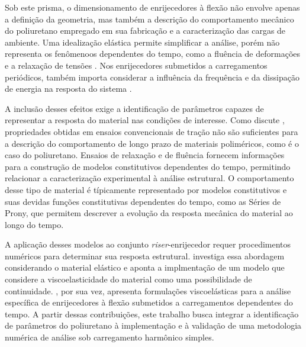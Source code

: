 \documentclass[arial,centeredequations,english,brazilian,oneside,section=TITLE]{ifes8}
\begin{document}

Sob este prisma, o dimensionamento de enrijecedores à flexão não envolve apenas a definição da geometria, mas também a descrição
do comportamento mecânico do poliuretano empregado em sua fabricação e a caracterização das cargas de ambiente. Uma 
idealização elástica permite simplificar a análise, porém não representa os fenômenoos dependentes do tempo, como a fluência 
de deformações e a relaxação de tensões \cite{Pagliosa2004}. Nos enrijecedores submetidos a carregamentos periódicos, também
importa considerar a influência da frequência e da dissipação de energia na resposta do sistema \cite{Caire2011}. 

A inclusão desses efeitos exige a identificação de parâmetros capazes de representar a resposta do material nas condições
de interesse. Como discute , propriedades obtidas em ensaios convencionais de tração não são suficientes
para a descrição do comportamento de longo prazo de materiais poliméricos, como é o caso do poliuretano. Ensaios de 
relaxação e de fluência fornecem informações para a construção de modelos constitutivos dependentes do tempo, permitindo
relacionar a caracterização experimental à análise estrutural. O comportamento desse tipo de material é típicamente 
representado por modelos constitutivos e suas devidas funções constitutivas dependentes do tempo, como as Séries de Prony,
que permitem descrever a evolução da resposta mecânica do material ao longo do tempo.

A aplicação desses modelos ao conjunto \emph{riser}-enrijecedor requer procedimentos numéricos para determinar sua resposta
estrutural.  investiga essa abordagem considerando o material elástico e aponta a implmentação de um modelo 
que considere a viscoelasticidade do material como uma possibilidade de continuidade. , por sua vez, apresenta
formulações viscoelásticas para a análise específica de enrijecedores à flexão submetidos a carregamentos dependentes do 
tempo. A partir dessas contribuições, este trabalho busca integrar a identificação de parâmetros do poliuretano à 
implementação e à validação de uma metodologia numérica de análise sob carregamento harmônico simples.
\end{document}
